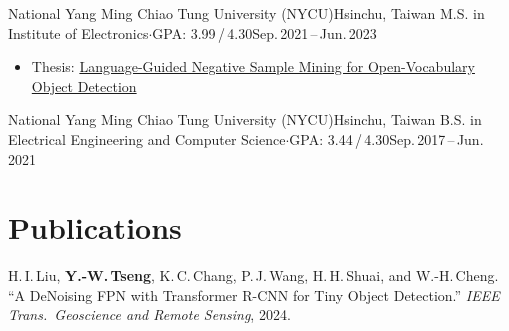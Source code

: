 \documentclass[10pt, a4paper]{article}
\begin{document}
\eduEntry
    {National Yang Ming Chiao Tung University (NYCU)}{Hsinchu, Taiwan}
    {M.S. in Institute of Electronics\enspace$\cdot$\enspace GPA: 3.99\,/\,4.30}{Sep.\,2021\,--\,Jun.\,2023}
\begin{itemize}[leftmargin=1.4em, topsep=1pt, itemsep=0pt, parsep=0pt]
    \item\small Thesis: \href{https://ieeexplore.ieee.org/abstract/document/10457133}{Language-Guided Negative Sample Mining for Open-Vocabulary Object Detection}
\end{itemize}

\eduEntry
    {National Yang Ming Chiao Tung University (NYCU)}{Hsinchu, Taiwan}
    {B.S. in Electrical Engineering and Computer Science\enspace$\cdot$\enspace GPA: 3.44\,/\,4.30}{Sep.\,2017\,--\,Jun.\,2021}

\section{Publications}

\vspace{2pt}
\vspace{1pt}
\begin{enumerate}[leftmargin=*, topsep=2pt, itemsep=2pt, parsep=0pt, label={\small[\arabic*]}]
    \item\small H.\,I.\,Liu, \textbf{Y.-W.\,Tseng}, K.\,C.\,Chang, P.\,J.\,Wang, H.\,H.\,Shuai, and W.-H.\,Cheng.
    ``A DeNoising FPN with Transformer R-CNN for Tiny Object Detection.''
    \textit{IEEE Trans.\ Geoscience and Remote Sensing}, 2024.\enspace\href{https://arxiv.org/abs/2406.05755}{}\enspace\href{https://github.com/hoiliu-0801/DNTR}{}
\end{enumerate}
\end{document}

